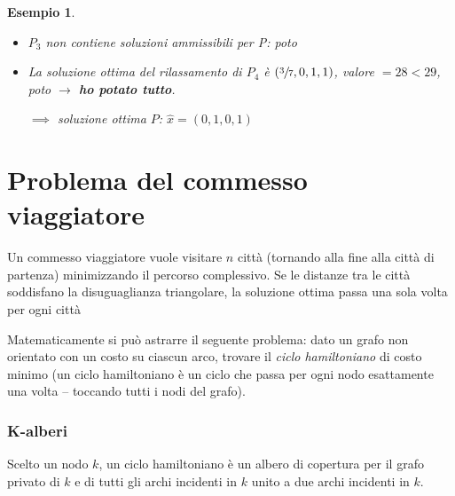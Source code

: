 \documentclass[a4paper,11pt]{book}
\theoremstyle{break}
\newtheorem{es}[deff]{Esempio}
\begin{document}
\begin{es}
\begin{center}
\end{center}

\begin{itemize}
 \item $P_3$ non contiene soluzioni ammissibili per P: poto

\item La soluzione ottima del rilassamento di $P_4$ è 
$(\sfrac{3}{7}, 0, 1, 1)$, valore $=28 < 29$, poto
$\to$ \textbf{ho potato tutto}.

$\implies$ soluzione ottima $P$: $\hat x = (0, 1, 0, 1)$

\end{itemize}


\end{es}



\section{Problema del commesso viaggiatore}
Un commesso viaggiatore vuole visitare $n$ città (tornando alla fine alla città di partenza) minimizzando il percorso complessivo. Se le distanze tra le città soddisfano la disuguaglianza triangolare, la soluzione ottima passa una sola volta per ogni città
\smallskip

Matematicamente si può astrarre il seguente problema: dato un grafo non orientato con un costo su ciascun arco, trovare il \emph{ciclo hamiltoniano} di costo minimo (un ciclo hamiltoniano è un ciclo che passa per ogni nodo esattamente una volta -- toccando tutti i nodi del grafo).

\subsubsection{K-alberi}

Scelto un nodo $k$, un ciclo hamiltoniano è un albero di copertura per il grafo privato di $k$ e di tutti gli archi incidenti in $k$ unito a due archi incidenti in $k$.
\end{document}
